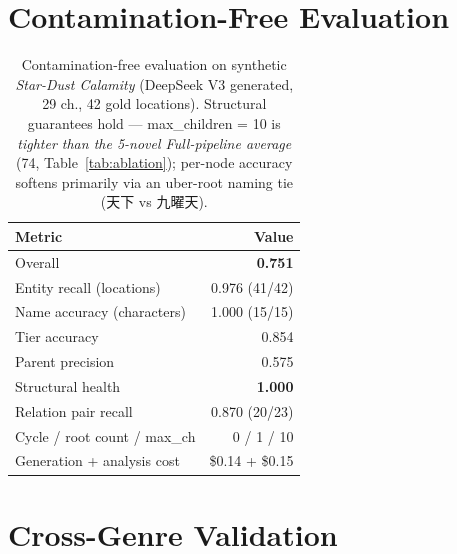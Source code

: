 \documentclass[11pt]{article}
\newenvironment{CJK}[2]{}{}
\newcommand{\cmark}{\ding{51}}
\begin{document}
\section{Contamination-Free Evaluation}
\label{app:contamination}

\begin{table}[H]
\centering
\footnotesize
\setlength{\tabcolsep}{3pt}
\begin{tabular}{lr}
\toprule
\textbf{Metric} & \textbf{Value} \\
\midrule
Overall & \textbf{0.751} \\
Entity recall (locations) & 0.976 (41/42) \\
Name accuracy (characters) & 1.000 (15/15) \\
Tier accuracy & 0.854 \\
Parent precision & 0.575 \\
Structural health & \textbf{1.000} \\
Relation pair recall & 0.870 (20/23) \\
\midrule
Cycle / root count / max\_ch & \cmark\ 0 / 1 / 10 \\
Generation + analysis cost & \$0.14 + \$0.15 \\
\bottomrule
\end{tabular}
\caption{Contamination-free evaluation on synthetic \textit{Star-Dust Calamity} (DeepSeek V3 generated, 29 ch., 42 gold locations). Structural guarantees hold --- max\_children = 10 is \emph{tighter than the 5-novel Full-pipeline average} (74, Table~\ref{tab:ablation}); per-node accuracy softens primarily via an uber-root naming tie (\begin{CJK}{UTF8}{gbsn}天下\end{CJK} vs \begin{CJK}{UTF8}{gbsn}九曜天\end{CJK}).}
\label{tab:contamination}
\end{table}

\section{Cross-Genre Validation}
\label{app:cross}
\end{document}
